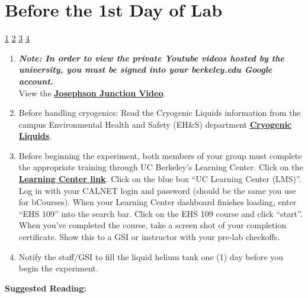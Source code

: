 \documentclass{../lab}
\begin{document}
\section{Before the 1st Day of Lab}

\signatures \hyperlink{Low-Frequency Oscillator}{1} \hyperlink{Steps}{2} \hyperlink{AC Effect}{3} \hyperlink{Josephson Constant}{4}

\begin{enumerate}
    \item \emph{\textbf{Note: In order to view the private Youtube videos hosted by the university, you must be signed into your berkeley.edu Google account.}}\\
    View the \href{http://youtu.be/Z9vBPQrG0U4}{\textbf{Josephson Junction Video}}.

    \item Before handling cryogenics: Read the Cryogenic Liquids information from the campus Environmental Health and Safety (EH\&S) department \href{https://berkeley-physics111b.github.io/assets/pdf/oldwebsitestructure/SHE/77cryogenic.pdf}{\textbf{Cryogenic Liquids}}.

    \item Before beginning the experiment, both members of your group must complete the appropriate training through UC Berkeley's Learning Center. Click on the \href{https://ucpath.berkeley.edu/uc-learning-center-lms} {\textbf{Learning Center link}}. Click on the blue box ``UC Learning Center (LMS)''. Log in with your CALNET login and password (should be the same you use for bCourses). When your Learning Center dashboard finishes loading, enter ``EHS 109'' into the search bar. Click on the EHS 109 course and click ``start''. When you've completed the course, take a screen shot of your completion certificate. Show this to a GSI or instructor with your pre-lab checkoffs.

    \item Notify the staff/GSI to fill the liquid helium tank one (1) day before you begin the experiment.

\end{enumerate}

\noindent\textbf{Suggested Reading:}

\end{document}
